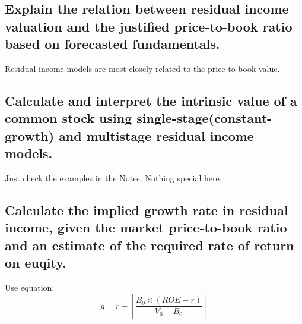 \documentclass{article}
\begin{document}
\subsection{Explain the relation between residual income valuation and the justified
price-to-book ratio based on forecasted fundamentals.}
Residual income models are most closely related to the price-to-book value.
\subsection{Calculate and interpret the intrinsic value of a common stock using
single-stage(constant-growth) and multistage residual income models.}
Just check the examples in the Notes. Nothing special here.
\subsection{Calculate the implied growth rate in residual income, given the market
price-to-book ratio and an estimate of the required rate of return on euqity.}
Use equation:
$$
g=r-[\frac{B_0\times(ROE-r)}{V_0-B_0}]
$$
\end{document}
